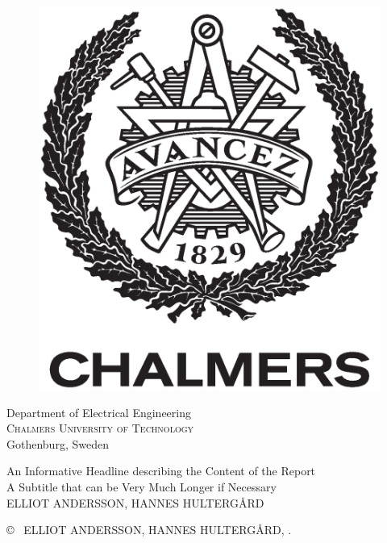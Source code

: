 \begin{center}
\begin{figure}[H]
    \includegraphics[width=0.2\pdfpagewidth]{figure/auxiliary/AvancezChalmers_black_centered.eps} \\
    \fi
	\end{figure}	\vspace{5mm}	
	
    Department of Electrical Engineering \\
	\textsc{Chalmers University of Technology} \\
	Gothenburg, Sweden \the\year \\
\end{center}


\newpage
\thispagestyle{plain}
\vspace*{4.5cm}
An Informative Headline describing the Content of the Report\\
A Subtitle that can be Very Much Longer if Necessary\\
ELLIOT ANDERSSON, HANNES HULTERGÅRD \setlength{\parskip}{1cm}

\copyright ~ ELLIOT ANDERSSON, HANNES HULTERGÅRD, \the\year. \setlength{\parskip}{1cm}

